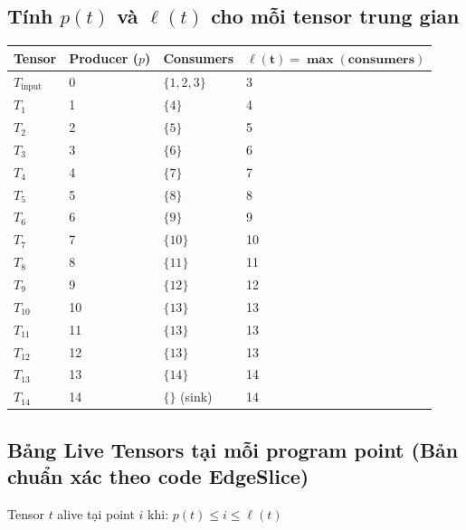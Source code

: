 \documentclass[11pt,a4paper]{article}
\begin{document}
\newpage

\subsection{Tính $p(t)$ và $\ell(t)$ cho mỗi tensor trung gian}

\begin{table}[H]
\centering
\begin{tabular}{llll}
\toprule
\textbf{Tensor} & \textbf{Producer ($p$)} & \textbf{Consumers} & $\boldsymbol{\ell(t) = \max(\text{consumers})}$ \\
\midrule
$T_{\text{input}}$ & 0  & $\{1, 2, 3\}$ & 3 \\
$T_1$              & 1  & $\{4\}$       & 4 \\
$T_2$              & 2  & $\{5\}$       & 5 \\
$T_3$              & 3  & $\{6\}$       & 6 \\
$T_4$              & 4  & $\{7\}$       & 7 \\
$T_5$              & 5  & $\{8\}$       & 8 \\
$T_6$              & 6  & $\{9\}$       & 9 \\
$T_7$              & 7  & $\{10\}$      & 10 \\
$T_8$              & 8  & $\{11\}$      & 11 \\
$T_9$              & 9  & $\{12\}$      & 12 \\
$T_{10}$             & 10 & $\{13\}$      & 13 \\
$T_{11}$             & 11 & $\{13\}$      & 13 \\
$T_{12}$             & 12 & $\{13\}$      & 13 \\
$T_{13}$             & 13 & $\{14\}$      & 14 \\
$T_{14}$             & 14 & $\{\}$ (sink) & 14 \\
\bottomrule
\end{tabular}
\end{table}

\subsection{Bảng Live Tensors tại mỗi program point (Bản chuẩn xác theo code EdgeSlice)}

Tensor $t$ alive tại point $i$ khi: $p(t) \le i \le \ell(t)$
\end{document}
